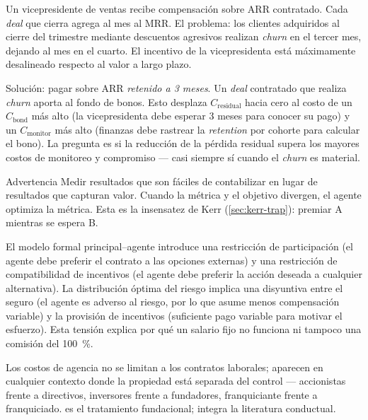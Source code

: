 \begin{example}
Un vicepresidente de ventas recibe compensación sobre ARR contratado. Cada \emph{deal} que cierra agrega  al mes al MRR. El problema: los clientes adquiridos al cierre del trimestre mediante descuentos agresivos realizan \emph{churn} en el tercer mes, dejando  al mes en el cuarto. El incentivo de la vicepresidenta está máximamente desalineado respecto al valor a largo plazo.

Solución: pagar sobre ARR \emph{retenido a 3 meses}. Un \emph{deal} contratado que realiza \emph{churn} aporta  al fondo de bonos. Esto desplaza \(C_{\text{residual}}\) hacia cero al costo de un \(C_{\text{bond}}\) más alto (la vicepresidenta debe esperar 3 meses para conocer su pago) y un \(C_{\text{monitor}}\) más alto (finanzas debe rastrear la \emph{retention} por cohorte para calcular el bono). La pregunta es si la reducción de la pérdida residual supera los mayores costos de monitoreo y compromiso --- casi siempre sí cuando el \emph{churn} es material.
\end{example}

\begin{admonition}{Advertencia}
Medir resultados que son fáciles de contabilizar en lugar de resultados que capturan valor. Cuando la métrica y el objetivo divergen, el agente optimiza la métrica. Esta es la insensatez de Kerr (\cref{sec:kerr-trap}): premiar A mientras se espera B.
\end{admonition}

El modelo formal principal--agente introduce una restricción de participación (el agente debe preferir el contrato a las opciones externas) y una restricción de compatibilidad de incentivos (el agente debe preferir la acción deseada a cualquier alternativa). La distribución óptima del riesgo implica una disyuntiva entre el seguro (el agente es adverso al riesgo, por lo que asume menos compensación variable) y la provisión de incentivos (suficiente pago variable para motivar el esfuerzo). Esta tensión explica por qué un salario fijo no funciona ni tampoco una comisión del \qty{100}{\percent}.

Los costos de agencia no se limitan a los contratos laborales; aparecen en cualquier contexto donde la propiedad está separada del control --- accionistas frente a directivos, inversores frente a fundadores, franquiciante frente a franquiciado. \textcite{jensen1976agency} es el tratamiento fundacional; \textcite{robbins2022} integra la literatura conductual.

